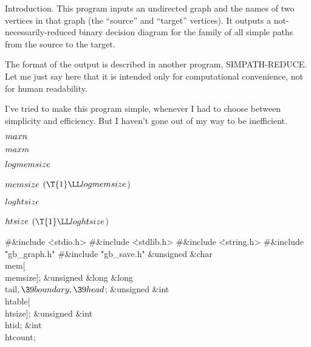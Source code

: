 
\datethis




Introduction. This program inputs an undirected graph and the names of
two
vertices in that graph (the ``source'' and ``target'' vertices).
It outputs a not-necessarily-reduced binary decision diagram
for the family of all simple paths from the source to the target.

The format of the output is described in another program,
{\mc SIMPATH-REDUCE}. Let me just say here that it is intended
only for computational convenience, not for human readability.

I've tried to make this program simple, whenever I had to
choose between simplicity and efficiency. But I haven't gone
out of my way to be inefficient.

\Y\B\4\D$\\{maxn}$ \5
\par
\B\4\D$\\{maxm}$ \5
\par
\B\4\D$\\{logmemsize}$ \5
\par
\B\4\D$\\{memsize}$ \5
$(\T{1}\LL\\{logmemsize}{}$)\par
\B\4\D$\\{loghtsize}$ \5
\par
\B\4\D$\\{htsize}$ \5
$(\T{1}\LL\\{loghtsize}{}$)\par
\Y\B\8\#\&{include} \.{<stdio.h>}\6
\8\#\&{include} \.{<stdlib.h>}\6
\8\#\&{include} \.{<string.h>}\6
\8\#\&{include} \.{"gb\_graph.h"}\6
\8\#\&{include} \.{"gb\_save.h"}\6
\&{unsigned} \&{char} \\{mem}[\\{memsize}];\6
\&{unsigned} \&{long} \&{long} \\{tail}${},\39\\{boundary},\39\\{head}{}$;\6
\&{unsigned} \&{int} \\{htable}[\\{htsize}];\6
\&{unsigned} \&{int} \\{htid};\6
\&{int} \\{htcount};\6
